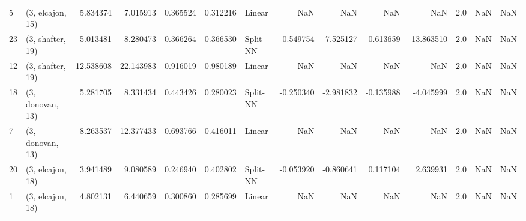 \begin{tabular}{llrrrrlrrrrrrl}
5  &  (3, elcajon, 15) &   5.834374 &   7.015913 &   0.365524 &  0.312216 &      Linear &             NaN &           NaN &            NaN &          NaN &            2.0 &    NaN &              NaN \\
23 &  (3, shafter, 19) &   5.013481 &   8.280473 &   0.366264 &  0.366530 &    Split-NN &       -0.549754 &     -7.525127 &      -0.613659 &   -13.863510 &            2.0 &    NaN &              NaN \\
12 &  (3, shafter, 19) &  12.538608 &  22.143983 &   0.916019 &  0.980189 &      Linear &             NaN &           NaN &            NaN &          NaN &            2.0 &    NaN &              NaN \\
18 &  (3, donovan, 13) &   5.281705 &   8.331434 &   0.443426 &  0.280023 &    Split-NN &       -0.250340 &     -2.981832 &      -0.135988 &    -4.045999 &            2.0 &    NaN &              NaN \\
7  &  (3, donovan, 13) &   8.263537 &  12.377433 &   0.693766 &  0.416011 &      Linear &             NaN &           NaN &            NaN &          NaN &            2.0 &    NaN &              NaN \\
20 &  (3, elcajon, 18) &   3.941489 &   9.080589 &   0.246940 &  0.402802 &    Split-NN &       -0.053920 &     -0.860641 &       0.117104 &     2.639931 &            2.0 &    NaN &              NaN \\
1  &  (3, elcajon, 18) &   4.802131 &   6.440659 &   0.300860 &  0.285699 &      Linear &             NaN &           NaN &            NaN &          NaN &            2.0 &    NaN &              NaN \\
\bottomrule
\end{tabular}
